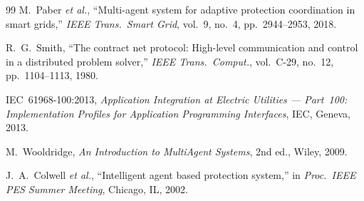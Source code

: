 \documentclass[11pt, a4paper]{article}
\begin{document}
\begin{thebibliography}{99}
M.~Paber \emph{et al.},
``Multi-agent system for adaptive protection coordination in smart grids,''
\emph{IEEE Trans.\ Smart Grid}, vol.~9, no.~4, pp.~2944--2953, 2018.

R.~G.~Smith,
``The contract net protocol: High-level communication and control in a
distributed problem solver,''
\emph{IEEE Trans.\ Comput.}, vol.~C-29, no.~12, pp.~1104--1113, 1980.

IEC~61968-100:2013, \emph{Application Integration at Electric Utilities ---
Part~100: Implementation Profiles for Application Programming Interfaces},
IEC, Geneva, 2013.

M.~Wooldridge,
\emph{An Introduction to MultiAgent Systems}, 2nd ed., Wiley, 2009.

J.~A.~Colwell \emph{et al.},
``Intelligent agent based protection system,''
in \emph{Proc.\ IEEE PES Summer Meeting}, Chicago, IL, 2002.
\end{thebibliography}
\end{document}
